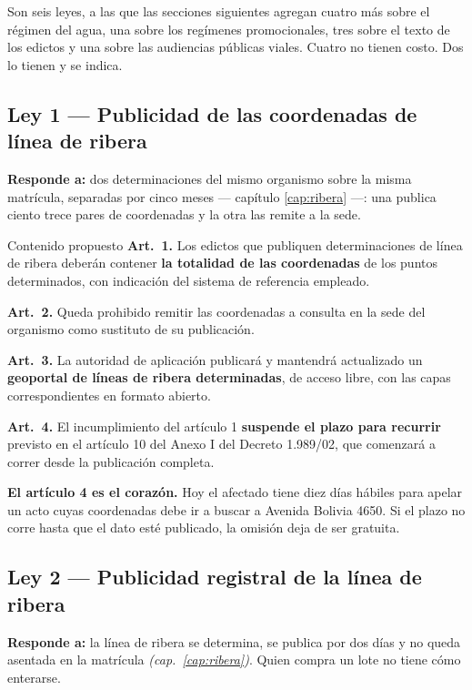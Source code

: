 Son seis leyes, a las que las secciones siguientes agregan cuatro más sobre el régimen del
agua, una sobre los regímenes promocionales, tres sobre el texto de los edictos y una sobre las
audiencias públicas viales. Cuatro no tienen costo. Dos lo tienen y se indica.

\subsection{Ley 1 --- Publicidad de las coordenadas de línea de ribera}

\textbf{Responde a:} dos determinaciones del mismo organismo sobre la misma matrícula,
separadas por cinco meses --- capítulo \ref{cap:ribera} ---: una publica ciento trece pares de
coordenadas y la otra las remite a la sede.

\begin{ficha}{Contenido propuesto}
\textbf{Art.\ 1.} Los edictos que publiquen determinaciones de línea de ribera deberán
contener \textbf{la totalidad de las coordenadas} de los puntos determinados, con indicación
del sistema de referencia empleado.

\textbf{Art.\ 2.} Queda prohibido remitir las coordenadas a consulta en la sede del organismo
como sustituto de su publicación.

\textbf{Art.\ 3.} La autoridad de aplicación publicará y mantendrá actualizado un
\textbf{geoportal de líneas de ribera determinadas}, de acceso libre, con las capas
correspondientes en formato abierto.

\textbf{Art.\ 4.} El incumplimiento del artículo 1 \textbf{suspende el plazo para recurrir}
previsto en el artículo 10 del Anexo I del Decreto 1.989/02, que comenzará a correr desde la
publicación completa.
\end{ficha}

\textbf{El artículo 4 es el corazón.} Hoy el afectado tiene diez días hábiles para apelar un
acto cuyas coordenadas debe ir a buscar a Avenida Bolivia 4650. Si el plazo no corre hasta que
el dato esté publicado, la omisión deja de ser gratuita.

\subsection{Ley 2 --- Publicidad registral de la línea de ribera}

\textbf{Responde a:} la línea de ribera se determina, se publica por dos días y no queda
asentada en la matrícula \textit{(cap.\ \ref{cap:ribera})}. Quien compra un lote no tiene cómo enterarse.

